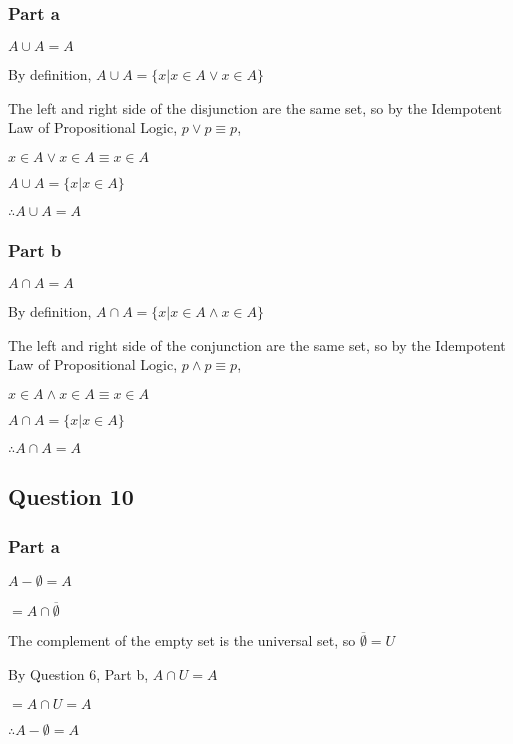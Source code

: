 \documentclass[12pt]{article}
\begin{document}

\subsubsection*{Part a}

$A \cup A = A$

By definition, $A \cup A = \{ x \left| x \in A \lor x \in A \right.\}$

The left and right side of the disjunction are the same set, so by the 
Idempotent Law of Propositional Logic, $p \lor p \equiv p$,

$x \in A \lor x \in A \equiv x \in A$

$A \cup A = \{ x \left| x \in A \right.\}$

$\therefore A \cup A = A$

\subsubsection*{Part b}

$A \cap A = A$

By definition, $A \cap A = \{ x \left| x \in A \land x \in A \right.\}$

The left and right side of the conjunction are the same set, so by the 
Idempotent Law of Propositional Logic, $p \land p \equiv p$,

$x \in A \land x \in A \equiv x \in A$

$A \cap A = \{ x \left| x \in A \right.\}$

$\therefore A \cap A = A$

\subsection*{Question 10}

\subsubsection*{Part a}

$A - \emptyset = A$

$= A \cap \overline{\emptyset}$

The complement of the empty set is the universal set, so $\overline{\emptyset} = U$

By Question 6, Part b, $A \cap U = A$

$= A \cap U = A$

$\therefore A - \emptyset = A$
\end{document}
